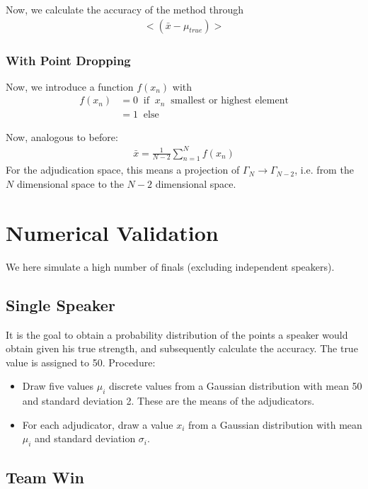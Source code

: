 \documentclass[%
 reprint,
 amsmath,amssymb,
 aps,
]{revtex4-1}
\begin{document}
Now, we calculate the accuracy of the method through 
\begin{align}
<(\bar{x} - \mu_{true})>
\end{align}

\subsubsection{With Point Dropping}

Now, we introduce a function $f(x_n)$ with 
\begin{align}
f(x_n) &= 0 \;\; \text{if} \;\; x_n \;\; \text{smallest or highest element}\\
&= 1 \;\; \text{else} 
\end{align}

Now, analogous to before:
\begin{align}
\bar{x} = \frac{1}{N-2}\sum_{n=1}^{N} f(x_n)
\end{align}
For the adjudication space, this means a projection of $\Gamma_N \rightarrow \Gamma_{N-2}$, i.e. from the $N$ dimensional space to the $N-2$ dimensional space. 


\section{Numerical Validation}

We here simulate a high number of finals (excluding independent speakers). 
\subsection{Single Speaker}
It is the goal to obtain a probability distribution of the points a speaker would obtain given his true strength, and subsequently calculate the accuracy. The true value is assigned to 50. Procedure:
\begin{itemize}
	\item Draw five values $\mu_i$ discrete values from a Gaussian distribution with mean 50 and standard deviation 2. These are the means of the adjudicators.
	\item For each adjudicator, draw a value $x_i$ from a Gaussian distribution with mean $\mu_i$ and standard deviation $\sigma_i$. 
\end{itemize}


\subsection{Team Win}
\end{document}
